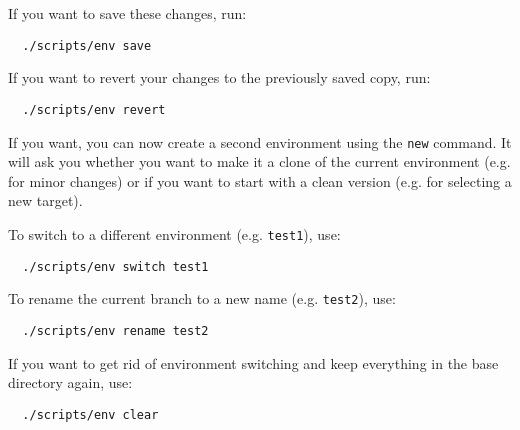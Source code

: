 If you want to save these changes, run:
\begin{Verbatim}
  ./scripts/env save
\end{Verbatim}
If you want to revert your changes to the previously saved copy, run:
\begin{Verbatim}
  ./scripts/env revert
\end{Verbatim}

If you want, you can now create a second environment using the \texttt{new} command.
It will ask you whether you want to make it a clone of the current environment (e.g.
for minor changes) or if you want to start with a clean version (e.g. for selecting
a new target).

To switch to a different environment (e.g. \texttt{test1}), use:
\begin{Verbatim}
  ./scripts/env switch test1
\end{Verbatim}

To rename the current branch to a new name (e.g. \texttt{test2}), use:
\begin{Verbatim}
  ./scripts/env rename test2
\end{Verbatim}

If you want to get rid of environment switching and keep everything in the base directory
again, use:
\begin{Verbatim}
  ./scripts/env clear
\end{Verbatim}
